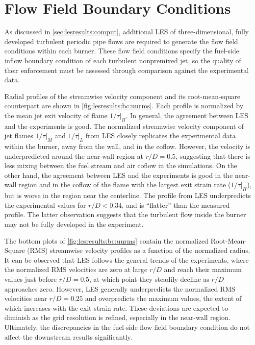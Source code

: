 \section{Flow Field Boundary Conditions}
\label{sec:lesresults:bc}

As discussed in \cref{sec:lesresults:comput}, additional LES of three-dimensional, fully developed turbulent periodic pipe flows are required to generate the flow field conditions within each burner. These flow field conditions specify the fuel-side inflow boundary condition of each turbulent nonpremixed jet, so the quality of their enforcement must be assessed through comparison against the experimental data. 

Radial profiles of the streamwise velocity component and its root-mean-square counterpart are shown in \cref{fig:lesresults:bc:uurms}. Each profile is normalized by the mean jet exit velocity of flame $1/\tau|_H$. In general, the agreement between LES and the experiments is good. The normalized streamwise velocity component of jet flames $1/\tau|_M$ and $1/\tau|_L$ from LES closely replicates the experimental data within the burner, away from the wall, and in the coflow. However, the velocity is underpredicted around the near-wall region at $r/D = 0.5$, suggesting that there is less mixing between the fuel stream and air coflow in the simulations. On the other hand, the agreement between LES and the experiments is good in the near-wall region and in the coflow of the flame with the largest exit strain rate ($1/\tau|_H$), but is worse in the region near the centerline. The profile from LES underpredicts the experimental values for $r/D < 0.34$, and is ``flatter'' than the measured profile. The latter observation suggests that the turbulent flow inside the burner may not be fully developed in the experiment.

The bottom plots of \cref{fig:lesresults:bc:uurms} contain the normalized Root-Mean-Square (RMS) streamwise velocity profiles as a function of the normalized radius. It can be observed that LES follows the general trends of the experiments, where the normalized RMS velocities are zero at large $r/D$ and reach their maximum values just before $r/D = 0.5$, at which point they steadily decline as $r/D$ approaches zero. However, LES generally underpredicts the normalized RMS velocities near $r/D = 0.25$ and overpredicts the maximum values, the extent of which increases with the exit strain rate. These deviations are expected to diminish as the grid resolution is refined, especially in the near-wall region. Ultimately, the discrepancies in the fuel-side flow field boundary condition do not affect the downstream results significantly.

